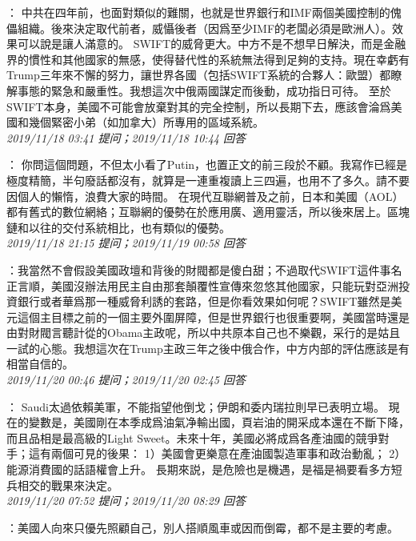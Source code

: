 \documentclass[twocolumn]{ctexart}
\begin{document}
：
中共在四年前，也面對類似的難關，也就是世界銀行和IMF兩個美國控制的傀儡組織。後來決定取代前者，威懾後者（因爲至少IMF的老闆必須是歐洲人）。效果可以說是讓人滿意的。 
SWIFT的威脅更大。中方不是不想早日解決，而是金融界的慣性和其他國家的無感，使得替代性的系統無法得到足夠的支持。現在幸虧有Trump三年來不懈的努力，讓世界各國（包括SWIFT系統的合夥人：歐盟）都瞭解事態的緊急和嚴重性。我想這次中俄兩國謀定而後動，成功指日可待。 
至於SWIFT本身，美國不可能會放棄對其的完全控制，所以長期下去，應該會淪爲美國和幾個緊密小弟（如加拿大）所專用的區域系統。
\\

\textit{\hfill\noindent\small 2019/11/18 03:41 提问；2019/11/18 10:44 回答}

：
你問這個問題，不但太小看了Putin，也置正文的前三段於不顧。我寫作已經是極度精簡，半句廢話都沒有，就算是一連重複讀上三四遍，也用不了多久。請不要因個人的懶惰，浪費大家的時間。 
在現代互聯網普及之前，日本和美國（AOL）都有舊式的數位網絡；互聯網的優勢在於應用廣、適用靈活，所以後來居上。區塊鏈和以往的交付系統相比，也有類似的優勢。
\\

\textit{\hfill\noindent\small 2019/11/18 21:15 提问；2019/11/19 00:58 回答}

：我當然不會假設美國政壇和背後的財閥都是傻白甜；不過取代SWIFT這件事名正言順，美國沒辦法用民主自由那套顛覆性宣傳來忽悠其他國家，只能玩對亞洲投資銀行或者華爲那一種威脅利誘的套路，但是你看效果如何呢？SWIFT雖然是美元這個主目標之前的一個主要外圍屏障，但是世界銀行也很重要啊，美國當時還是由對財閥言聽計從的Obama主政呢，所以中共原本自己也不樂觀，采行的是姑且一試的心態。我想這次在Trump主政三年之後中俄合作，中方内部的評估應該是有相當自信的。
\\

\textit{\hfill\noindent\small 2019/11/20 00:46 提问；2019/11/20 02:45 回答}

：
Saudi太過依賴美軍，不能指望他倒戈；伊朗和委内瑞拉則早已表明立場。
現在的變數是，美國剛在本季成爲油氣净輸出國，頁岩油的開采成本還在不斷下降，而且品相是最高級的Light Sweet。未來十年，美國必將成爲各產油國的競爭對手；這有兩個可見的後果：
1）美國會更樂意在產油國製造軍事和政治動亂；
2）能源消費國的話語權會上升。
長期來説，是危險也是機遇，是福是禍要看多方短兵相交的戰果來決定。
\\

\textit{\hfill\noindent\small 2019/11/20 07:52 提问；2019/11/20 08:29 回答}

：美國人向來只優先照顧自己，別人搭順風車或因而倒霉，都不是主要的考慮。
\\
\end{document}
